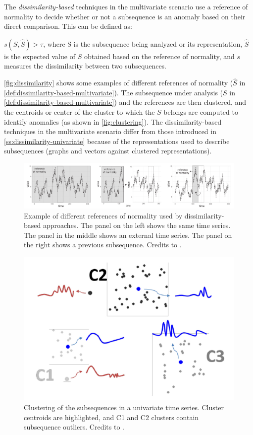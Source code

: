 The \textit{dissimilarity-based} techniques in the multivariate scenario use a reference of normality to decide whether or not a subsequence is an anomaly based on their direct comparison. This can be defined as:
\begin{definition}\label{def:dissimilarity-based-multivariate}
    $s(S, \hat{S}) > \tau $, where S is the subsequence being analyzed or its representation, $\hat{S}$ is the expected value of $S$ obtained based on the reference of normality, and $s$ measures the dissimilarity between two subsequences.
\end{definition}
\autoref{fig:dissimilarity} shows some examples of different references of normality ($\hat{S}$ in \autoref{def:dissimilarity-based-multivariate}). The subsequence under analysis ($S$ in \autoref{def:dissimilarity-based-multivariate}) and the references are then clustered, and the centroids or center of the cluster to which the $S$ belongs are computed to identify anomalies (as shown in \autoref{fig:clustering}). The dissimilarity-based techniques in the multivariate scenario differ from those introduced in \autoref{ss:dissimilarity-univariate} because of the representations used to describe subsequences (graphs and vectors against clustered representations).
\begin{figure}[t]
\centering
\includegraphics[width=1\linewidth]{figures/introduction-2/dissimilarity.png}
\caption{Example of different references of normality used by dissimilarity-based approaches. The panel on the left shows the same time series. The panel in the middle shows an external time series. The panel on the right shows a previous subsequence. Credits to \cite{blazquez2020review}.}
\label{fig:dissimilarity}
\end{figure}
\begin{figure}[t]
\centering
\includegraphics[width=0.5\linewidth]{figures/introduction-2/clustering.png}
\caption{Clustering of the subsequences in a univariate time series. Cluster centroids are highlighted, and C1
and C2 clusters contain subsequence outliers. Credits to \cite{blazquez2020review}.}
\label{fig:clustering}
\end{figure}
